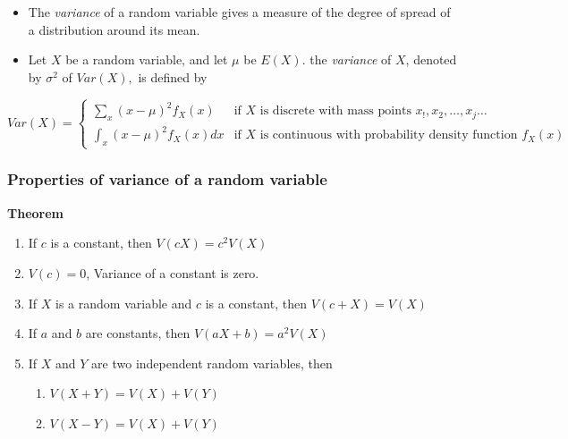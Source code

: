 \documentclass[]{book}
\providecommand{\tightlist}{%
  \setlength{\itemsep}{0pt}\setlength{\parskip}{0pt}}
\begin{document}
\begin{itemize}
\item
  The \emph{variance} of a random variable gives a measure of the degree of spread of a distribution around its mean.
\item
  Let \(X\) be a random variable, and let \(\mu\) be \(E(X).\) the \emph{variance} of \(X\), denoted by \(\sigma^2\) of \(Var(X),\) is defined by
\end{itemize}

\begin{equation}
Var(X) =
\begin{cases} 
\sum_{x}(x-\mu)^2f_X(x) & \text{if } X \text{ is  discrete with mass points }  x_!, x_2, \dots, x_j\dots \\
\int_x (x-\mu)^2 f_X(x)dx & \text{if } X \text{ is continuous with probability density function }  f_X(x)
\end{cases}
\end{equation}

\hypertarget{properties-of-variance-of-a-random-variable}{%
\subsubsection{Properties of variance of a random variable}\label{properties-of-variance-of-a-random-variable}}

\textbf{Theorem}

\begin{enumerate}
\def\labelenumi{\alph{enumi}.}
\tightlist
\item
  If \(c\) is a constant, then \(V(cX) = c^2V(X)\)
\item
  \(V(c) = 0\), Variance of a constant is zero.
\item
  If \(X\) is a random variable and \(c\) is a constant, then \(V(c+X) = V(X)\)
\item
  If \(a\) and \(b\) are constants, then \(V(aX+b)= a^2V(X)\)
\item
  If \(X\) and \(Y\) are two independent random variables, then

  \begin{enumerate}
  \def\labelenumii{\roman{enumii}.}
  \tightlist
  \item
    \(V(X+Y) = V(X) + V(Y)\)
  \item
    \(V(X-Y) = V(X) + V(Y)\)
  \end{enumerate}
\end{enumerate}
\end{document}
